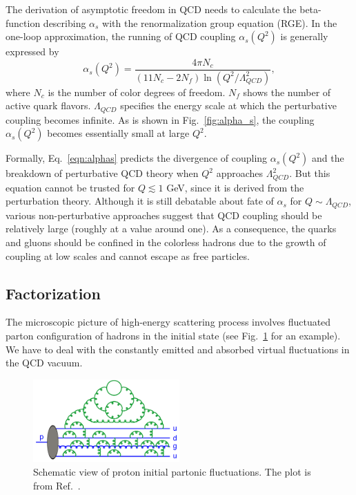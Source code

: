 The derivation of asymptotic freedom in QCD needs to calculate the beta-function
describing $\alpha_{s}$ with the renormalization group equation (RGE). In the
one-loop approximation, the running of QCD coupling $\alpha_{s}(Q^{2})$ is
generally expressed by~\cite{Collins:1987pm}
\begin{equation}
\alpha_{s}(Q^{2})=\frac{4\pi N_{c}}{(11N_{c}-2N_{f})\ln(Q^{2}/\Lambda^{2}_{QCD})},
\label{eqn:alphas}
\end{equation}
where $N_{c}$ is the number of color degrees of freedom. $N_{f}$ shows the
number of active quark flavors. $\Lambda_{QCD}$ specifies the energy scale at
which the perturbative coupling becomes infinite. As is shown in
Fig.~\ref{fig:alpha_s}, the coupling $\alpha_{s}(Q^{2})$ becomes essentially
small at large $Q^{2}$.

Formally, Eq.~\ref{eqn:alphas} predicts the divergence of coupling
$\alpha_{s}(Q^{2})$ and the breakdown of perturbative QCD theory when $Q^{2}$
approaches $\Lambda^{2}_{QCD}$. But this equation cannot be trusted for
$Q\lesssim 1$ GeV, since it is derived from the perturbation theory. Although it
is still debatable about fate of $\alpha_{s}$ for $Q\sim\Lambda_{QCD}$, various
non-perturbative approaches suggest that QCD coupling should be relatively large
(roughly at a value around one). As a consequence, the quarks and gluons should
be confined in the colorless hadrons due to the growth of coupling at low scales
and cannot escape as free particles.


\subsection{Factorization}
The microscopic picture of high-energy scattering process involves fluctuated
parton configuration of hadrons in the initial state (see
Fig.~\ref{fig:hadron_config} for an example). We have to deal with the
constantly emitted and absorbed virtual fluctuations in the QCD vacuum. 

\begin{figure}
\centering
\includegraphics[width=0.5\textwidth]{plots/chpt2/hadron_initial_state.png}
\caption[Schematic view of proton initial state parton configurations] {
Schematic view of proton initial partonic fluctuations. The plot is from Ref.~\cite{Skands:2012ts}. }
\label{fig:hadron_config}
\end{figure}

